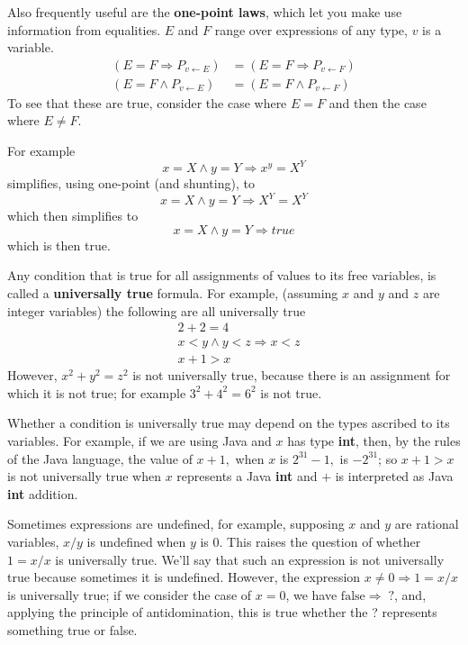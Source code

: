 \documentclass[11pt]{article}%
\begin{document}
Also frequently useful are the \textbf{one-point laws}, which let you make use
information from equalities. $E$ and $F$ range over expressions of any type,
$v$ is a variable.
\begin{align*}
\left(  E=F\Rightarrow P_{v\leftarrow E}\right)   &  =\left(  E=F\Rightarrow
P_{v\leftarrow F}\right) \\
\left(  E=F\wedge P_{v\leftarrow E}\right)   &  =\left(  E=F\wedge
P_{v\leftarrow F}\right)
\end{align*}
To see that these are true, consider the case where $E=F$ and then the case
where $E\neq F$.

For example%
\[
x=X\wedge y=Y\Rightarrow x^{y}=X^{Y}%
\]
simplifies, using one-point (and shunting), to%
\[
x=X\wedge y=Y\Rightarrow X^{Y}=X^{Y}%
\]
which then simplifies to%
\[
x=X\wedge y=Y\Rightarrow\mathit{true}%
\]
which is then true.

Any condition that is true for all assignments of values to its free
variables, is called a \textbf{universally true} formula. For example,
(assuming $x$ and $y$ and $z$ are integer variables) the following are all
universally true%
\begin{align*}
&  \left.  2+2=4\right. \\
&  \left.  x<y\wedge y<z\Rightarrow x<z\right. \\
&  \left.  x+1>x\right.
\end{align*}
However, $x^{2}+y^{2}=z^{2}$ is not universally true, because there is an
assignment for which it is not true; for example $3^{2}+4^{2}=6^{2}$ is not true.

Whether a condition is universally true may depend on the types ascribed to
its variables. For example, if we are using Java and $x$ has type
\textbf{int}, then, by the rules of the Java language, the value of $x+1,$
when $x$ is $2^{31}-1,$ is $-2^{31}$; so $x+1>x$ is not universally true when
$x$ represents a Java \textbf{int} and $+$ is interpreted as Java \textbf{int} addition.

\begin{comment}
    Note that Dafny uses short circuiting three valued logic, so it might be a good idea to change POL to
    do the same.
\end{comment}

Sometimes expressions are undefined, for example, supposing $x$ and $y$ are
rational variables, $x/y$ is undefined when $y$ is $0$. This raises the
question of whether $1=x/x$ is universally true. We'll say that such an
expression is not universally true because sometimes it is undefined.
However, the expression $x\neq 0\Rightarrow1=x/x$ is universally true;
if we consider the case of $x=0$, we
have $\mathrm{false}\Rightarrow\;?$, and, applying the principle of
antidomination, this is $\mathrm{true}$ whether the ? represents something true or false.
\end{document}
